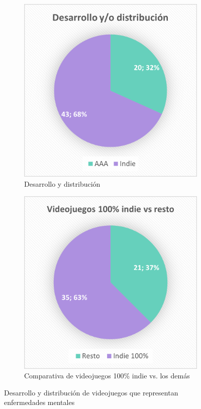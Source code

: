 \documentclass[12pt, a4paper,twoside,titlepage]{book}
\begin{document}
\begin{figure}
\centering
\begin{subfigure}{.5\textwidth}
  \centering
  \includegraphics[width=.95\linewidth]{Graficas estudio/G7;Desarrollo.png}
  \caption{Desarrollo y distribución}
\end{subfigure}%
\begin{subfigure}{.5\textwidth}
  \centering
  \includegraphics[width=.95\linewidth]{Graficas estudio/G8;DesarrolloIndie.png}
  \caption{Comparativa de videojuegos 100\% indie vs. los demás}
  \label{fig:ESTjuegosindie}
\end{subfigure}
\caption{Desarrollo y distribución de videojuegos que representan enfermedades mentales}
\label{fig:ESTDesarrollo}
\end{figure}
\end{document}
